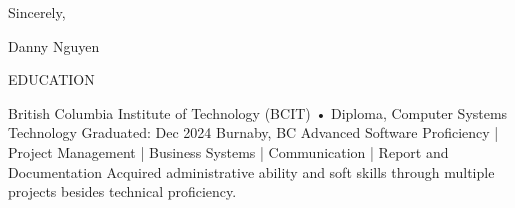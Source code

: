 \documentclass[letterpaper,11pt]{article}
\begin{document}
\vspace{20pt}

Sincerely,

\vspace{40pt} %
Danny Nguyen

\vspace{10pt}
EDUCATION

British Columbia Institute of Technology (BCIT)
• Diploma, Computer Systems Technology
Graduated: Dec 2024
Burnaby, BC
Advanced Software Proficiency | Project Management | Business Systems | Communication | Report and Documentation
Acquired administrative ability and soft skills through multiple projects besides technical proficiency.
\end{document}
